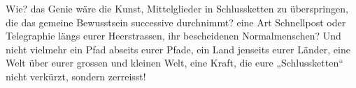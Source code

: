 Wie? das Genie wäre die Kunst, Mittelglieder in Schlussketten zu überspringen, die das gemeine Bewusstsein successive durchnimmt? eine Art Schnellpost oder Telegraphie längs eurer Heerstrassen, ihr bescheidenen Normalmenschen? Und nicht vielmehr ein Pfad abseits eurer Pfade, ein Land jenseits eurer Länder, eine Welt über eurer grossen und kleinen Welt, eine Kraft, die eure „Schlussketten“ nicht verkürzt, sondern zerreisst!
\par

